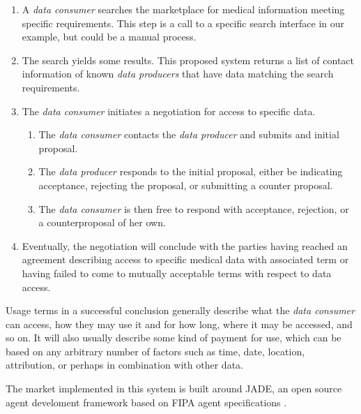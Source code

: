 \documentclass[10pt, conference, compsocconf]{IEEEtran}
\begin{document}
\begin{enumerate}

\item A \textit{data consumer} searches the marketplace for medical information meeting specific requirements.  This step is a call to a specific search interface in our example, but could be a manual process.

\item The search yields some results.  This proposed system returns a list of contact information of known \textit{data producers} that have data matching the search requirements.

\item The \textit{data consumer} initiates a negotiation for access to specific data.

\begin{enumerate}

\item The \textit{data consumer} contacts the \textit{data producer} and submits and initial proposal.

\item The \textit{data producer} responds to the initial proposal, either be indicating acceptance, rejecting the proposal, or submitting a counter proposal.

\item The \textit{data consumer} is then free to respond with acceptance, rejection, or a counterproposal of her own.

\end{enumerate}

\item Eventually, the negotiation will conclude with the parties having reached an agreement describing access to specific medical data with associated term or having failed to come to mutually acceptable terms with respect to data access.  

\end{enumerate}

Usage terms in a successful conclusion generally describe what the \textit{data consumer} can access, how they may use it and for how long, where it may be accessed, and so on.  It will also usually describe some kind of payment for use, which can be based on any arbitrary number of factors such as time, date, location, attribution, or perhaps in combination with other data.

The market implemented in this system is built around JADE, an open source agent develoment framework based on FIPA agent specifications \cite{Emr:Web:Jade,Emr:Web:Fipa}.
\end{document}
